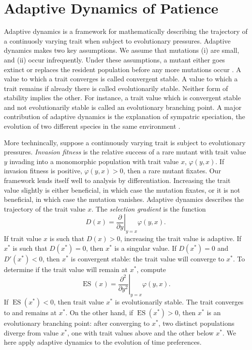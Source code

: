 \documentclass[titlepage, hidelinks, 12pt]{article}
\theoremstyle{plain}
\theoremstyle{remark}
\theoremstyle{definition}
\DeclareMathOperator{\ES}{ES}
\begin{document}
\section{Adaptive Dynamics of Patience} \label{sec:adaptive_dynamics}
Adaptive dynamics is a framework for mathematically describing the trajectory of a continuosly varying trait when subject to evolutionary pressures. 
Adaptive dynamics makes two key assumptions. We assume that mutations (i) are small, and (ii) occur infrequently.
Under these assumptions, a mutant either goes extinct or replaces the resident population before any more mutations occur \cite{doebeli05}.
A value to which a trait converges is called convergent stable. A value to which a trait remains if already there is called evolutionarily stable.
Neither form of stability implies the other. For instance, a trait value which is convergent stable and not evolutionarily stable is called an
evolutionary branching point. A major contribution of adaptive dynamics is the explanation of sympatric speciation, the 
evolution of two different species in the same environment \cite{doebeli11}. 

More technincally, suppose a continuously varying trait is subject to evolutionary pressures. \textit{Invasion fitness} is the relative
success of a rare mutant with trait value $y$ invading into a monomorphic population with trait value $x$, $\varphi(y, x)$. If invasion
fitness is positive, $\varphi(y, x) > 0$, then a rare mutant fixates. Our framework lends itself well to analysis by differentiation. 
Increasing the trait value slightly is either beneficial, in which case the mutation fixates, or it is not beneficial, in which
case the mutation vanishes. Adaptive dynamics describes the trajectory of the trait value $x$. 
The \textit{selection gradient} is the function 
\begin{equation}
    D(x) = \left.\frac{\partial }{\partial y} \right\vert_{y = x}\varphi(y, x).
    \label{eqn:selection_gradient}
\end{equation}
If trait value $x$ is such that $D(x) > 0$, increasing the trait value is adaptive. If $x^*$ is such that $D(x^*) = 0$, then $x^*$ is a
singular value. If $D(x^*) = 0$ and $D'(x^*) < 0$, 
then $x^*$ is convergent stable: the trait value will converge to $x^*$. To determine if the trait value will remain at $x^*$, compute
\begin{equation}
    \ES(x) = \left.\frac{\partial^2 }{\partial y^2} \right\vert_{y = x}\varphi(y, x).
    \label{eqn:evolutionary_stability}
\end{equation}
If $\ES(x^*) < 0$, then trait value $x^*$ is evolutionarily stable. The trait converges to and remains at $x^*$. On the other hand, if
$\ES(x^*) > 0$, then $x^*$ is an evolutionary branching point: after converging to $x^*$, two distinct populations diverge from value $x^*$, one
with trait values above and the other below $x^*$.  We here apply adaptive dynamics to the evolution of time preferences. 
\end{document}
